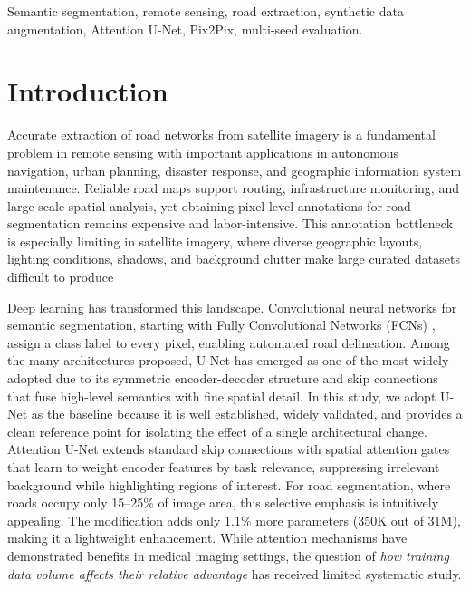\documentclass[conference]{IEEEtran}
\begin{document}
\begin{IEEEkeywords}
Semantic segmentation, remote sensing, road extraction, synthetic data augmentation, Attention U-Net, Pix2Pix, multi-seed evaluation.
\end{IEEEkeywords}

\section{Introduction}
\label{sec:introduction}


Accurate extraction of road networks from satellite imagery is a fundamental problem in remote sensing with important applications in autonomous navigation, urban planning, disaster response, and geographic information system maintenance. Reliable road maps support routing, infrastructure monitoring, and large-scale spatial analysis, yet obtaining pixel-level annotations for road segmentation remains expensive and labor-intensive. This annotation bottleneck is especially limiting in satellite imagery, where diverse geographic layouts, lighting conditions, shadows, and background clutter make large curated datasets difficult to produce

Deep learning has transformed this landscape. Convolutional neural networks for semantic segmentation, starting with Fully Convolutional Networks (FCNs) \cite{b4}, assign a class label to every pixel, enabling automated road delineation. Among the many architectures proposed, U-Net \cite{b1} has emerged as one of the most widely adopted due to its symmetric encoder-decoder structure and skip connections that fuse high-level semantics with fine spatial detail. 
In this study, we adopt U-Net as the baseline because it is well established, widely validated, and provides a clean reference point for isolating the effect of a single architectural change.
Attention U-Net \cite{b2} extends standard skip connections with spatial attention gates that learn to weight encoder features by task relevance, suppressing irrelevant background while highlighting regions of interest. For road segmentation, where roads occupy only 15--25\% of image area, this selective emphasis is intuitively appealing. The modification adds only 1.1\% more parameters (350K out of 31M), making it a lightweight enhancement. While attention mechanisms have demonstrated benefits in medical imaging settings, the question of \emph{how training data volume affects their relative advantage} has received limited systematic study. 
\end{document}
